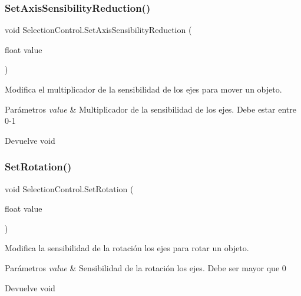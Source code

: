 \subsubsection{\texorpdfstring{SetAxisSensibilityReduction()}{SetAxisSensibilityReduction()}}
{\footnotesize\ttfamily void Selection\+Control.\+Set\+Axis\+Sensibility\+Reduction (\begin{DoxyParamCaption}\item[{float}]{value }\end{DoxyParamCaption})\hspace{0.3cm}{\ttfamily [inline]}}

Modifica el multiplicador de la sensibilidad de los ejes para mover un objeto. 
\begin{DoxyParams}{Parámetros}
{\em value} & Multiplicador de la sensibilidad de los ejes. Debe estar entre 0-\/1 \\
\hline
\end{DoxyParams}
\begin{DoxyReturn}{Devuelve}
void 
\end{DoxyReturn}
\mbox{\label{class_selection_control_ae30e28c63db233cb7a7b9d71174c2846}} 
\subsubsection{\texorpdfstring{SetRotation()}{SetRotation()}}
{\footnotesize\ttfamily void Selection\+Control.\+Set\+Rotation (\begin{DoxyParamCaption}\item[{float}]{value }\end{DoxyParamCaption})\hspace{0.3cm}{\ttfamily [inline]}}

Modifica la sensibilidad de la rotación los ejes para rotar un objeto. 
\begin{DoxyParams}{Parámetros}
{\em value} & Sensibilidad de la rotación los ejes. Debe ser mayor que 0 \\
\hline
\end{DoxyParams}
\begin{DoxyReturn}{Devuelve}
void 
\end{DoxyReturn}
\mbox{\label{class_selection_control_a8b366f1e8d48984ff2914bb74726466e}} 

